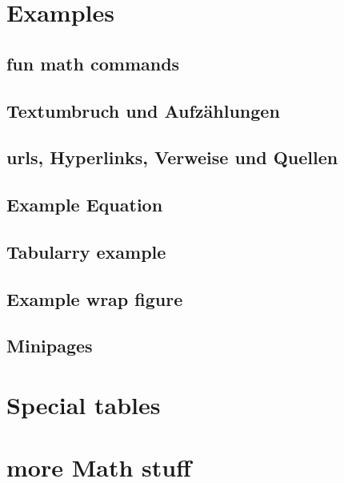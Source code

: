\documentclass[final, 12pt]{article}
\begin{document}
  

\section{Examples}
\subsection{fun math commands}


\subsection{Textumbruch und Aufzählungen}


\subsection{urls, Hyperlinks, Verweise und Quellen}


\subsection{Example Equation}


\subsection{Tabularry example}


\subsection{Example wrap figure}


\subsection{Minipages}


\section{Special tables}


\section{more Math stuff}


\newpage
\listoftables
\listoffigures
\printbibliography{}
\end{document}
